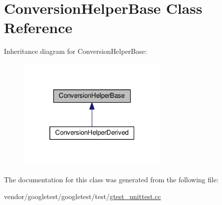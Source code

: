 \hypertarget{classConversionHelperBase}{}\section{Conversion\+Helper\+Base Class Reference}
\label{classConversionHelperBase}


Inheritance diagram for Conversion\+Helper\+Base\+:\nopagebreak
\begin{figure}[H]
\begin{center}
\leavevmode
\includegraphics[width=208pt]{classConversionHelperBase__inherit__graph}
\end{center}
\end{figure}


The documentation for this class was generated from the following file\+:\begin{DoxyCompactItemize}
\item 
vendor/googletest/googletest/test/\hyperlink{gtest__unittest_8cc}{gtest\+\_\+unittest.\+cc}\end{DoxyCompactItemize}
